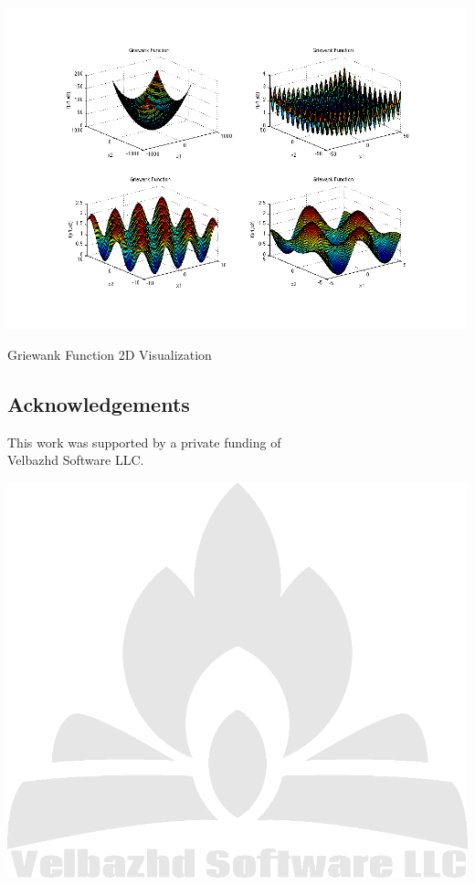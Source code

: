 \documentclass[a0,portrait,25pt]{sciposter}
\begin{document}
\begin{multicols}{3}
\begin{mdframed}[backgroundcolor=white,roundcorner=4pt,shadow=true,linewidth=1pt]
\begin{minipage}[c]{1\linewidth}
\includegraphics[width=0.9\linewidth]{fig02b}
\caption{Griewank Function 2D Visualization}
\end{minipage}

\end{mdframed}

\begin{mdframed}[backgroundcolor=white,roundcorner=4pt,shadow=true,linewidth=1pt]
\section*{Acknowledgements}
This work was supported by a private funding of \\ Velbazhd Software LLC. 

\includegraphics[width=0.98\linewidth]{veld_soft_camp_fire_logo}
\end{mdframed}


\end{multicols}
\end{document}
